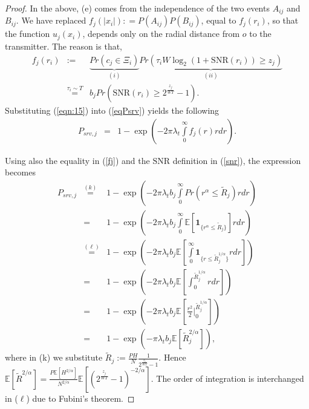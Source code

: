 \documentclass[conference]{IEEEtran}
\begin{document}
\begin{proof}
In the above, (e) comes from the independence of the two events $A_{ij}$ and $B_{ij}$. We have replaced $f_j(|x_i|): = P(A_{ij})P(B_{ij})$, equal to $f_j(r_i)$, so that the function $u_j(x_i)$, depends only on the radial distance from $o$ to the transmitter. The reason is that,
\begin{eqnarray}
\label{fj}
f_j(r_i) & := & \underset{(i)}{\underbrace{Pr(c_j \in \Xi_i)}}\underset{(ii)}{\underbrace{Pr(\tau_i W\log_2 (1+\mathrm{SNR}(r_i)) \geq z_j)}}\nonumber\\
 & \overset{\tau_i\sim T}{=}  & b_j Pr\left(\mathrm{SNR}(r_i) \geq 2^{\frac{z_j}{W T}}-1\right).
\end{eqnarray}
Substituting (\ref{eqn:15}) into (\ref{eqPsrv}) yields the following
 \begin{eqnarray}
 P_{srv,j} & = &  1-\exp\left(-2\pi \lambda_t \int\limits_{0}^{\infty} f_j(r)r dr\right).
 \label{eqn:20}
\end{eqnarray}

Using also the equality in (\ref{fj}) and the $\mathrm{SNR}$ definition in (\ref{snr}), the expression becomes
\begin{eqnarray}
P_{srv,j} & \overset{(k)}{=}  & 1-\exp\left(-2\pi \lambda_t b_j \int\limits_{0}^{\infty} Pr(r^{\alpha} \leq \tilde{R}_j)rdr\right)\nonumber\\
& = & 1-\exp\left(-2\pi \lambda_t b_j \int\limits_{0}^{\infty}\mathbb{E}[\mathbf{1}_{\{r^{\alpha} \leq \tilde{R}_j\}}]rdr\right)\nonumber\\
&  \overset{(\ell)}{=}  & 1-\exp\left(-2\pi \lambda_t b_j \mathbb{E} \left[\int\limits_{0}^{\infty} \mathbf{1}_{\{ r \leq \tilde{R}_j^{1/\alpha} \}} rdr\right]\right)\nonumber\\
& = & 1-\exp\left(-2\pi \lambda_t b_j \mathbb{E} \left[\int_{0}^{\tilde{R}_j^{1/\alpha}}rdr\right]\right)\nonumber\\
& = & 1-\exp\left(-2\pi \lambda_t b_j \mathbb{E} \left[\frac {r^{2}} {2} |_{0}^{\tilde{R}_j^{1/\alpha}}\right]\right)\nonumber\\
& = & 1-\exp\left(-\pi \lambda_t b_j \mathbb{E}[\tilde{R}_j^{2/ \alpha}]\right),\nonumber
 \end{eqnarray}
 where in (k) we substitute $\tilde{R}_j := \frac {PH}{N} \frac {1}{2^{\frac{z_j}{WT}}-1}$. Hence $\mathbb{E}[\tilde{R}^{2/ \alpha}] = \frac{P\mathbb{E}[H^{2/\alpha}]}{N^{2/\alpha}}\mathbb{E}[ \left(2^{\frac{z_j}{WT}}-1\right)^{-2/\alpha}]$. The order of integration is interchanged in ($\ell$) due to Fubini's theorem. 
\end{proof}
\end{document}

